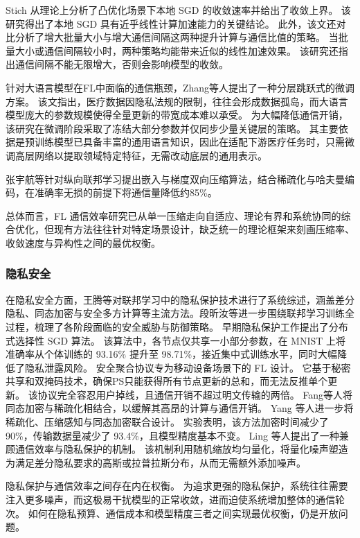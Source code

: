 \documentclass[master, vlined]{DissertUESTC}
\begin{document}
	Stich 从理论上分析了凸优化场景下本地 SGD 的收敛速率并给出了收敛上界。
	该研究得出了本地 SGD 具有近乎线性计算加速能力的关键结论。
	此外，该文还对比分析了增大批量大小与增大通信间隔这两种提升计算与通信比值的策略。
	当批量大小或通信间隔较小时，两种策略均能带来近似的线性加速效果。
	该研究还指出通信间隔不能无限增大，否则会影响模型的收敛。

	针对大语言模型在FL中面临的通信瓶颈，Zhang等人提出了一种分层跳跃式的微调方案。
	该文指出，医疗数据因隐私法规的限制，往往会形成数据孤岛，而大语言模型庞大的参数规模使得全量更新的带宽成本难以承受。
	为大幅降低通信开销，该研究在微调阶段采取了冻结大部分参数并仅同步少量关键层的策略。
	其主要依据是预训练模型已具备丰富的通用语言知识，因此在适配下游医疗任务时，只需微调高层网络以提取领域特定特征，无需改动底层的通用表示。

	张宇航等针对纵向联邦学习提出嵌入与梯度双向压缩算法，结合稀疏化与哈夫曼编码，在准确率无损的前提下将通信量降低约85\%。

	总体而言，FL 通信效率研究已从单一压缩走向自适应、理论有界和系统协同的综合优化，但现有方法往往针对特定场景设计，缺乏统一的理论框架来刻画压缩率、收敛速度与异构性之间的最优权衡。

	\subsubsection{隐私安全}

	在隐私安全方面，王腾等对联邦学习中的隐私保护技术进行了系统综述，涵盖差分隐私、同态加密与安全多方计算等主流方法。段昕汝等进一步围绕联邦学习训练全过程，梳理了各阶段面临的安全威胁与防御策略。
	早期隐私保护工作提出了分布式选择性 SGD 算法。
	该算法中，各节点仅共享一小部分参数，在 MNIST 上将准确率从个体训练的 93.16\% 提升至 98.71\%，接近集中式训练水平，同时大幅降低了隐私泄露风险。
	安全聚合协议专为移动设备场景下的 FL 设计。
	它基于秘密共享和双掩码技术，确保PS只能获得所有节点更新的总和，而无法反推单个更新。
	该协议完全容忍用户掉线，且通信开销不超过明文传输的两倍。
	Fang等人将同态加密与稀疏化相结合，以缓解其高昂的计算与通信开销。
	Yang 等人进一步将稀疏化、压缩感知与同态加密联合设计。
	实验表明，该方法加密时间减少了 90\%，传输数据量减少了 93.4\%，且模型精度基本不变。
	Ling 等人提出了一种兼顾通信效率与隐私保护的机制。
	该机制利用随机缩放均匀量化，将量化噪声塑造为满足差分隐私要求的高斯或拉普拉斯分布，从而无需额外添加噪声。

	隐私保护与通信效率之间存在内在权衡。
	为追求更强的隐私保护，系统往往需要注入更多噪声，而这极易干扰模型的正常收敛，进而迫使系统增加整体的通信轮次。
	如何在隐私预算、通信成本和模型精度三者之间实现最优权衡，仍是开放问题。
\end{document}
